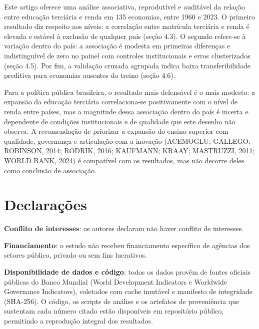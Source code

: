 \documentclass[12pt,a4paper]{article}
\begin{document}
Este artigo oferece uma análise associativa, reprodutível e auditável da relação entre educação terciária e renda em 135 economias, entre 1960 e 2023. O primeiro resultado diz respeito aos níveis: a correlação entre matrícula terciária e renda é elevada e estável à exclusão de qualquer país (seção 4.3). O segundo refere-se à variação dentro do país: a associação é modesta em primeiras diferenças e indistinguível de zero no painel com controles institucionais e erros clusterizados (seção 4.5). Por fim, a validação cruzada agrupada indica baixa transferibilidade preditiva para economias ausentes do treino (seção 4.6).

Para a política pública brasileira, o resultado mais defensável é o mais modesto: a expansão da educação terciária correlaciona-se positivamente com o nível de renda entre países, mas a magnitude dessa associação dentro do país é incerta e dependente de condições institucionais e de qualidade que este desenho não observa. A recomendação de priorizar a expansão do ensino superior com qualidade, governança e articulação com a inovação (ACEMOGLU; GALLEGO; ROBINSON, 2014; RODRIK, 2016; KAUFMANN; KRAAY; MASTRUZZI, 2011; WORLD BANK, 2024) é compatível com os resultados, mas não decorre deles como conclusão de associação.

\section*{Declarações}

\textbf{Conflito de interesses}: os autores declaram não haver conflito de interesses.

\textbf{Financiamento}: o estudo não recebeu financiamento específico de agências dos setores público, privado ou sem fins lucrativos.

\textbf{Disponibilidade de dados e código}: todos os dados provêm de fontes oficiais públicas do Banco Mundial (World Development Indicators e Worldwide Governance Indicators), coletados com cache imutável e manifesto de integridade (SHA-256). O código, os scripts de análise e os artefatos de proveniência que sustentam cada número citado estão disponíveis em repositório público, permitindo a reprodução integral dos resultados.

\begingroup
\setlength{\parindent}{0pt}
\setlength{\parskip}{6pt}
\end{document}
